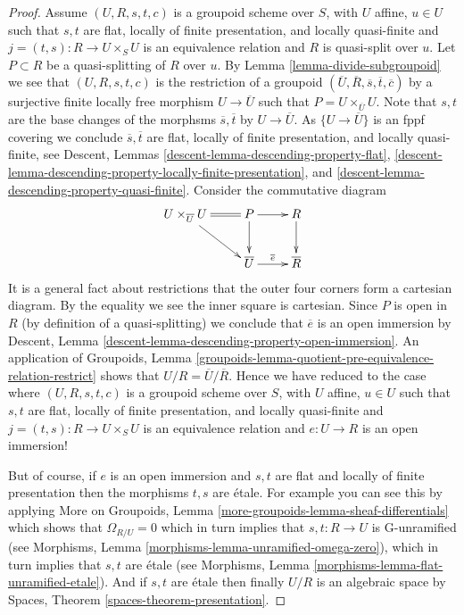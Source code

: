 \begin{proof}
\medskip\noindent
Assume $(U, R, s, t, c)$ is a groupoid scheme over $S$,
with $U$ affine, $u \in U$ such that $s, t$ are flat, locally
of finite presentation, and locally quasi-finite and
$j = (t, s) : R \to U \times_S U$ is an equivalence relation
and $R$ is quasi-split over $u$. Let $P \subset R$ be a quasi-splitting
of $R$ over $u$. By
Lemma \ref{lemma-divide-subgroupoid}
we see that $(U, R, s, t, c)$ is the restriction of a groupoid
$(\overline{U}, \overline{R}, \overline{s}, \overline{t}, \overline{c})$
by a surjective finite locally free morphism $U \to \overline{U}$ such that
$P = U \times_{\overline{U}} U$.
Note that $s, t$ are the base changes of the morphsms
$\overline{s}, \overline{t}$ by $U \to \overline{U}$.
As $\{U \to \overline{U}\}$ is an fppf covering we conclude
$\overline{s}, \overline{t}$ are flat, locally of finite presentation, and
locally quasi-finite, see
Descent, Lemmas \ref{descent-lemma-descending-property-flat},
\ref{descent-lemma-descending-property-locally-finite-presentation}, and
\ref{descent-lemma-descending-property-quasi-finite}.
Consider the commutative diagram
$$
\xymatrix{
U \times_{\overline{U}} U \ar@{=}[r] \ar[rd] & P \ar[r] \ar[d] & R \ar[d] \\
& \overline{U} \ar[r]^{\overline{e}} & \overline{R}
}
$$
It is a general fact about restrictions that the outer four corners
form a cartesian diagram. By the equality we see the inner square is
cartesian. Since $P$ is open in $R$ (by definition of a quasi-splitting)
we conclude that $\overline{e}$ is an open immersion by
Descent, Lemma \ref{descent-lemma-descending-property-open-immersion}.
An application of
Groupoids,
Lemma \ref{groupoids-lemma-quotient-pre-equivalence-relation-restrict}
shows that $U/R = \overline{U}/\overline{R}$. Hence we have reduced to
the case where $(U, R, s, t, c)$ is a groupoid scheme over $S$,
with $U$ affine, $u \in U$ such that $s, t$ are flat, locally
of finite presentation, and locally quasi-finite and
$j = (t, s) : R \to U \times_S U$ is an equivalence relation
and $e : U \to R$ is an open immersion!

\medskip\noindent
But of course, if $e$ is an open immersion and
$s, t$ are flat and locally of finite presentation
then the morphisms $t, s$ are \'etale.
For example you can see this by applying
More on Groupoids, Lemma \ref{more-groupoids-lemma-sheaf-differentials}
which shows that $\Omega_{R/U} = 0$ which in turn implies
that $s, t : R \to U$ is G-unramified (see
Morphisms, Lemma \ref{morphisms-lemma-unramified-omega-zero}),
which in turn implies that $s, t$ are \'etale (see
Morphisms, Lemma \ref{morphisms-lemma-flat-unramified-etale}).
And if $s, t$ are \'etale then finally $U/R$ is an algebraic
space by
Spaces, Theorem \ref{spaces-theorem-presentation}.
\end{proof}





